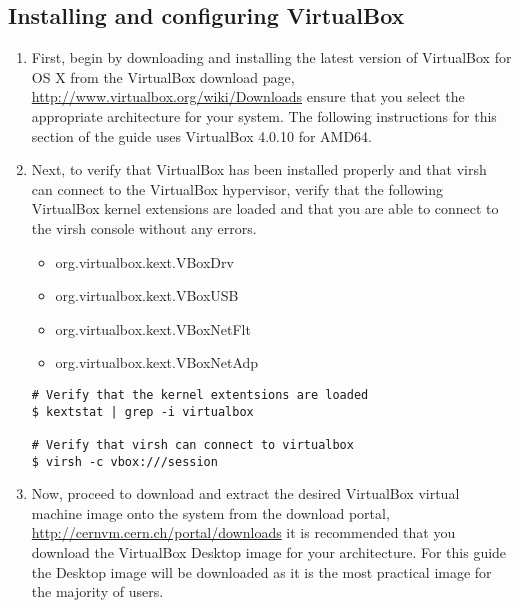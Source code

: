 \subsection{Installing and configuring VirtualBox}
\label{sec:osxvbox}
\begin{enumerate}
\item	First, begin by downloading and installing the latest version of VirtualBox for OS X from the VirtualBox download 
		page, \url{http://www.virtualbox.org/wiki/Downloads} ensure that you select the appropriate architecture for your 
		system. The following instructions for this section of the guide uses VirtualBox 4.0.10 for AMD64.
		
\item	Next, to verify that VirtualBox has been installed properly and that virsh can connect to the VirtualBox hypervisor, 
		verify that the following VirtualBox kernel extensions are loaded and that you are able to connect to the virsh console 
		without any errors.
		
\begin{itemize}
\item	org.virtualbox.kext.VBoxDrv
\item	org.virtualbox.kext.VBoxUSB
\item	org.virtualbox.kext.VBoxNetFlt
\item	org.virtualbox.kext.VBoxNetAdp
\end{itemize}

\lstset{language=bash,caption=Verify that virsh can Access VirtualBox}
\begin{lstlisting}
# Verify that the kernel extentsions are loaded
$ kextstat | grep -i virtualbox

# Verify that virsh can connect to virtualbox
$ virsh -c vbox:///session
\end{lstlisting}

\item	Now, proceed to download and extract the desired VirtualBox virtual machine image onto the system from the \cernvm download 
		portal, \url{http://cernvm.cern.ch/portal/downloads} it is recommended that you download the VirtualBox Desktop image for your 
		architecture. For this guide the Desktop image will be downloaded as it is the most practical image for the majority of 
		users.

		


\end{enumerate}
